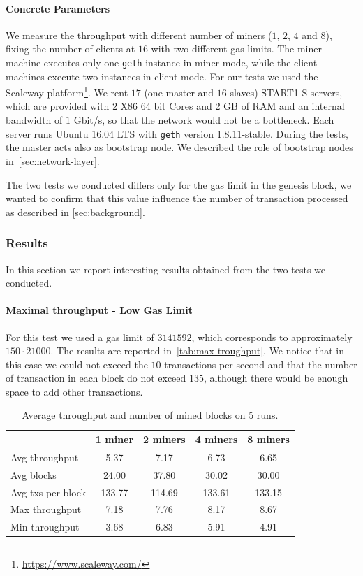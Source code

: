 \paragraph{Concrete Parameters}
We measure the throughput with different number of miners ($1$, $2$, $4$ and
$8$), fixing the number of clients at $16$ with two different gas limits. The
miner machine executes only one \texttt{geth} instance in miner mode, while the
client machines execute two instances in client mode. For our tests we used the
Scaleway platform\footnote{\url{https://www.scaleway.com/}}. We rent $17$ (one
master and $16$ slaves) START1-S servers, which are provided with $2$ X86 64 bit
Cores and $2$ GB of RAM and an internal bandwidth of $1$ Gbit/s, so that the
network would not be a bottleneck. Each server runs Ubuntu 16.04 LTS with
\texttt{geth} version 1.8.11-stable. During the tests, the master acts also as
bootstrap node. We described the role of bootstrap nodes
in~\autoref{sec:network-layer}.

The two tests we conducted differs only for the gas limit in the genesis block,
we wanted to confirm that this value influence the number of transaction
processed as described in \autoref{sec:background}.


\subsubsection{Results}

In this section we report interesting results obtained from the two tests we
conducted.

\paragraph{Maximal throughput - Low Gas Limit}
\label{sec:max-troughput}
For this test we used a gas limit of $3141592$, which corresponds to
approximately $150 \cdot 21000$. The results are reported
in~\autoref{tab:max-troughput}. We notice that in this case we could not exceed
the $10$ transactions per second and that the number of transaction in each
block do not exceed $135$, although there would be enough space to add other
transactions.

\begin{table}[h!]
  \centering
  \begin{tabular}{l | cccc}
    & 1 miner & 2 miners & 4 miners & 8 miners \\ \hline
    Avg throughput & 5.37 & 7.17 & 6.73 & 6.65 \\
    Avg blocks & 24.00 & 37.80 & 30.02 & 30.00 \\
    Avg txs per block & 133.77 & 114.69 & 133.61 & 133.15 \\
    Max throughput & 7.18 & 7.76 & 8.17 & 8.67 \\
    Min throughput & 3.68 & 6.83 & 5.91 & 4.91 \\
  \end{tabular}
  \caption{Average throughput and number of mined blocks on 5 runs.}
  \label{tab:max-troughput}
\end{table}


